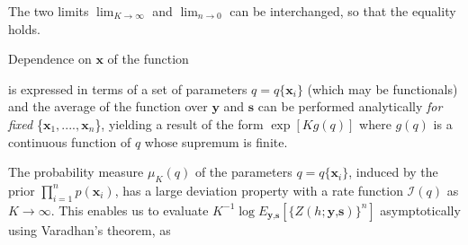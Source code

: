 \documentclass[letterpaper,english,10pt]{article}
\begin{document}
The two limits $\lim_{K \to \infty}$ and $\lim_{n \to 0}$ can be interchanged, so that the equality
holds.

Dependence on $\textbf{x}$ of the function

is expressed in terms of a set of parameters $q = q\{\textbf{x}_{i}\}$ (which may be functionals) and the average of the function over $\textbf{y}$ and $\textbf{s}$ can be performed analytically \textit{for fixed} \{$\textbf{x}_{1}, ...., \textbf{x}_{n}$\}, yielding a result of the form $\exp[{Kg(q)}]$ where $g(q)$ is a continuous function of $\textit{q}$ whose supremum is finite.

The probability measure $\mu_{K}(q)$ of the parameters $q = q\{\textbf{x}_{i}\}$, induced by the prior
$\prod_{i =1}^{n} p({\textbf{x}_{i}})$, has a large deviation property with a rate function $\mathscr{I}(q) $ as $K \to \infty$. This enables us to evaluate ${K^{-1}\log{E_{\textbf{y,s}}[\{Z(h;\textbf{y,s})\}^n]}}$ asymptotically using Varadhan’s theorem, as

\end{document}
